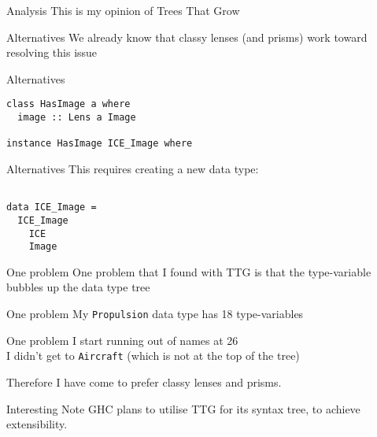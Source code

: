 \begin{frame}[fragile]
\begin{block}{Analysis}
This is my opinion of Trees That Grow
\end{block}
\end{frame}

\begin{frame}[fragile]
\begin{block}{Alternatives}
We already know that classy lenses (and prisms) work toward resolving this issue
\end{block}
\end{frame}

\begin{frame}[fragile]
\begin{block}{Alternatives}
\begin{lstlisting}[style=haskell]
class HasImage a where
  image :: Lens a Image

instance HasImage ICE_Image where
\end{lstlisting}
\end{block}
\end{frame}

\begin{frame}[fragile]
\begin{block}{Alternatives}
This requires creating a new data type:
\begin{lstlisting}[style=haskell]

data ICE_Image =
  ICE_Image
    ICE
    Image
\end{lstlisting}
\end{block}
\end{frame}

\begin{frame}[fragile]
\begin{block}{One problem}
One problem that I found with TTG is that the type-variable bubbles up the data type tree
\end{block}
\end{frame}

\begin{frame}[fragile]
\begin{block}{One problem}
My \lstinline{Propulsion} data type has 18 type-variables
\end{block}
\end{frame}

\begin{frame}[fragile]
\begin{block}{One problem}
I start running out of names at 26
\\[13pt]
I didn't get to \lstinline{Aircraft} \tiny{(which is not at the top of the tree)}
\end{block}
\end{frame}

\begin{frame}[fragile]
\begin{block}{Therefore}
I have come to prefer classy lenses and prisms.
\end{block}
\end{frame}

\begin{frame}[fragile]
\begin{block}{Interesting Note}
GHC plans to utilise TTG for its syntax tree, to achieve extensibility.
\end{block}
\end{frame}
